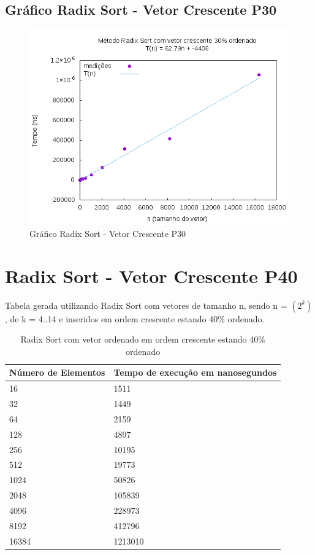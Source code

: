 \documentclass[12pt,a4paper,twoside]{report}
\begin{document}
\subsection{Gráfico Radix Sort - Vetor Crescente P30}
\begin{figure}[H]
    \centering
    \includegraphics[width=0.7\linewidth]{graficos/RadixSort/vIntCrescenteP30/vIntCrescenteP30.png}
  \caption{Gráfico Radix Sort - Vetor Crescente P30}
\end{figure}

\section{Radix Sort - Vetor Crescente P40}
Tabela gerada utilizando Radix Sort com vetores de tamanho n, sendo n = $(2^k)$, de k = 4..14 e inseridos em ordem crescente estando 40\% ordenado.
\begin{table}[H]
\centering
\caption{Radix Sort com vetor ordenado em ordem crescente estando 40\% ordenado}
\label{my-label}
\begin{tabular}{|l|l|}
\hline
\multicolumn{1}{|c|}{\textbf{Número de Elementos}} & \multicolumn{1}{c|}{\textbf{Tempo de execução em nanosegundos}} \\ \hline
16 & 1511 \\ \hline
32 & 1449 \\ \hline
64 & 2159 \\ \hline
128 & 4897 \\ \hline
256 & 10195 \\ \hline
512 & 19773 \\ \hline
1024 & 50826 \\ \hline
2048 & 105839 \\ \hline
4096 & 228973 \\ \hline
8192 & 412796 \\ \hline
16384 & 1213010 \\ \hline
\end{tabular}
\end{table}
\end{document}
